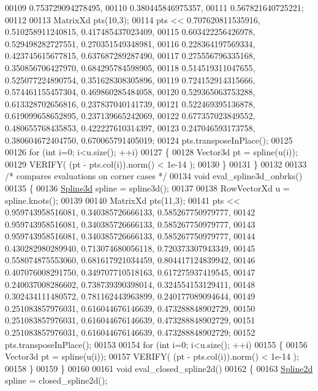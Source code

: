 \begin{DoxyCode}
00109     0.753729094278495,
00110     0.380445846975357,
00111     0.567821640725221;
00112 
00113   MatrixXd pts(10,3);
00114   pts << 0.707620811535916,   0.510258911240815,   0.417485437023409,
00115     0.603422256426978,   0.529498282727551,   0.270351549348981,
00116     0.228364197569334,   0.423745615677815,   0.637687289287490,
00117     0.275556796335168,   0.350856706427970,   0.684295784598905,
00118     0.514519311047655,   0.525077224890754,   0.351628308305896,
00119     0.724152914315666,   0.574461155457304,   0.469860285484058,
00120     0.529365063753288,   0.613328702656816,   0.237837040141739,
00121     0.522469395136878,   0.619099658652895,   0.237139665242069,
00122     0.677357023849552,   0.480655768435853,   0.422227610314397,
00123     0.247046593173758,   0.380604672404750,   0.670065791405019;
00124   pts.transposeInPlace();
00125 
00126   \textcolor{keywordflow}{for} (\textcolor{keywordtype}{int} i=0; i<u.size(); ++i)
00127   \{
00128     Vector3d pt = spline(u(i));
00129     VERIFY( (pt - pts.col(i)).norm() < 1e-14 );
00130   \}
00131 \}
00132 
00133 \textcolor{comment}{/* compares evaluations on corner cases */}
00134 \textcolor{keywordtype}{void} eval\_spline3d\_onbrks()
00135 \{
00136   \hyperlink{namespace_eigen_a652b0c454d2123a13f04922404bed782}{Spline3d} spline = spline3d();
00137 
00138   RowVectorXd u = spline.knots();
00139 
00140   MatrixXd pts(11,3);
00141   pts <<    0.959743958516081,   0.340385726666133,   0.585267750979777,
00142     0.959743958516081,   0.340385726666133,   0.585267750979777,
00143     0.959743958516081,   0.340385726666133,   0.585267750979777,
00144     0.430282980289940,   0.713074680056118,   0.720373307943349,
00145     0.558074875553060,   0.681617921034459,   0.804417124839942,
00146     0.407076008291750,   0.349707710518163,   0.617275937419545,
00147     0.240037008286602,   0.738739390398014,   0.324554153129411,
00148     0.302434111480572,   0.781162443963899,   0.240177089094644,
00149     0.251083857976031,   0.616044676146639,   0.473288848902729,
00150     0.251083857976031,   0.616044676146639,   0.473288848902729,
00151     0.251083857976031,   0.616044676146639,   0.473288848902729;
00152   pts.transposeInPlace();
00153 
00154   \textcolor{keywordflow}{for} (\textcolor{keywordtype}{int} i=0; i<u.size(); ++i)
00155   \{
00156     Vector3d pt = spline(u(i));
00157     VERIFY( (pt - pts.col(i)).norm() < 1e-14 );
00158   \}
00159 \}
00160 
00161 \textcolor{keywordtype}{void} eval\_closed\_spline2d()
00162 \{
00163   \hyperlink{namespace_eigen_aad3d357fe2fef560e7d8e592fb215fbf}{Spline2d} spline = closed\_spline2d();

\end{DoxyCode}
